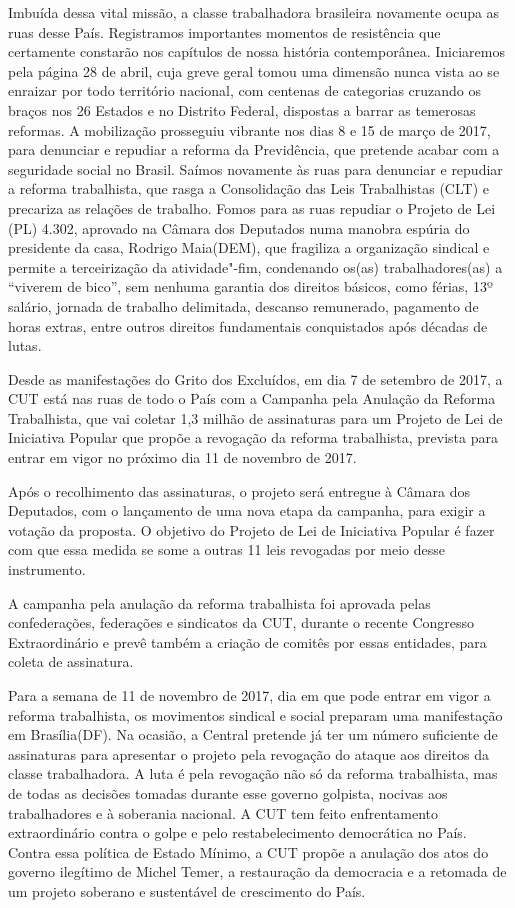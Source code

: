 Imbuída dessa vital missão, a classe trabalhadora brasileira novamente
ocupa as ruas desse País. Registramos importantes momentos de
resistência que certamente constarão nos capítulos de nossa história
contemporânea. Iniciaremos pela página 28 de abril, cuja greve geral
tomou uma dimensão nunca vista ao se enraizar por todo território
nacional, com centenas de categorias cruzando os braços nos 26 Estados e
no Distrito Federal, dispostas a barrar as temerosas reformas. A
mobilização prosseguiu vibrante nos dias 8 e 15 de março de 2017, para
denunciar e repudiar a reforma da Previdência, que pretende acabar com a
seguridade social no Brasil. Saímos novamente às ruas para denunciar e
repudiar a reforma trabalhista, que rasga a Consolidação das Leis
Trabalhistas (CLT) e precariza as relações de trabalho. Fomos para as
ruas repudiar o Projeto de Lei (PL) 4.302, aprovado na Câmara dos
Deputados numa manobra espúria do presidente da casa, Rodrigo Maia(DEM),
que fragiliza a organização sindical e permite a terceirização da
atividade"-fim, condenando os(as) trabalhadores(as) a ``viverem de
bico'', sem nenhuma garantia dos direitos básicos, como férias, 13º
salário, jornada de trabalho delimitada, descanso remunerado, pagamento
de horas extras, entre outros direitos fundamentais conquistados após
décadas de lutas.

Desde as manifestações do Grito dos Excluídos, em dia 7 de setembro de
2017, a CUT está nas ruas de todo o País com a Campanha pela Anulação da
Reforma Trabalhista, que vai coletar 1,3 milhão de assinaturas para um
Projeto de Lei de Iniciativa Popular que propõe a revogação da reforma
trabalhista, prevista para entrar em vigor no próximo dia 11 de novembro
de 2017.

Após o recolhimento das assinaturas, o projeto será entregue à Câmara
dos Deputados, com o lançamento de uma nova etapa da campanha, para
exigir a votação da proposta. O objetivo do Projeto de Lei de Iniciativa
Popular é fazer com que essa medida se some a outras 11 leis revogadas
por meio desse instrumento.

A campanha pela anulação da reforma trabalhista foi aprovada pelas
confederações, federações e sindicatos da CUT, durante o recente
Congresso Extraordinário e prevê também a criação de comitês por essas
entidades, para coleta de assinatura.

Para a semana de 11 de novembro de 2017, dia em que pode entrar em vigor
a reforma trabalhista, os movimentos sindical e social preparam uma
manifestação em Brasília(DF). Na ocasião, a Central pretende já ter um
número suficiente de assinaturas para apresentar o projeto pela
revogação do ataque aos direitos da classe trabalhadora. A luta é pela
revogação não só da reforma trabalhista, mas de todas as decisões
tomadas durante esse governo golpista, nocivas aos trabalhadores e à
soberania nacional. A CUT tem feito enfrentamento extraordinário contra
o golpe e pelo restabelecimento democrática no País. Contra essa
política de Estado Mínimo, a CUT propõe a anulação dos atos do governo
ilegítimo de Michel Temer, a restauração da democracia e a retomada de
um projeto soberano e sustentável de crescimento do País.

